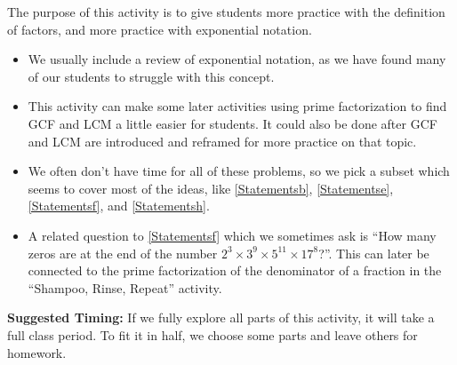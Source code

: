\documentclass{ximera}
\begin{document}
\newpage
\begin{instructorNotes}
The purpose of this activity is to give students more practice with the definition of factors, and more practice with exponential notation.

\begin{itemize}
    \item  We usually include a review of exponential notation, as we have found many of our students to struggle with this concept.
    \item This activity can make some later activities using prime factorization to find GCF and LCM a little easier for students.  It could also be done after GCF and LCM are introduced and reframed for more practice on that topic.
    \item We often don't have time for all of these problems, so we pick a subset which seems to cover most of the ideas, like \ref{Statementsb}, \ref{Statementse}, \ref{Statementsf}, and \ref{Statementsh}.
    \item A related question to \ref{Statementsf} which we sometimes ask is ``How many zeros are at the end of the number $2^3\times 3^9\times 5^{11} \times 17^8$?''.  This can later be connected to the prime factorization of the denominator of a fraction in  the ``Shampoo, Rinse, Repeat'' activity.
\end{itemize}







{\bf Suggested Timing:} If we fully explore all parts of this activity, it will take a full class period.  To fit it in half, we choose some parts and leave others for homework.
\end{instructorNotes}
\end{document}
